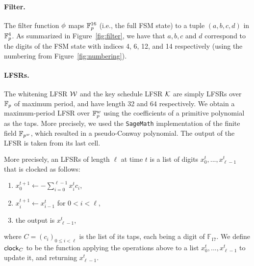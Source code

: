 

\paragraph{Filter.} The filter function $\phi$ maps $\mathbb{F}_{p}^{16}$ (i.e., the full FSM state) to a tuple $(a,b,c,d)$ in $\mathbb{F}_{p}^{4}$. As summarized in Figure~\ref{fig:filter}, we have that $a,b,c$ and $d$ correspond to the digits of the FSM state with indices 4, 6, 12, and 14 respectively (using the numbering from Figure~\ref{fig:numbering}).


\paragraph{LFSRs.} The whitening LFSR $\mathcal{W}$ and the key schedule LFSR $\mathcal{K}$ are simply LFSRs over \(\mathbb{F}_p\) of maximum period, and have length 32 and 64 respectively. We obtain a
  maximum-period LFSR over $\mathbb{F}_{p}^w$ using the coefficients of a
  primitive polynomial as the taps.  More precisely, we used the {\tt SageMath}
  implementation of the finite field $\mathbb{F}_{p^w}$, which resulted in a pseudo-Conway polynomial. The output of the LFSR is taken from its last cell.

  More precisely, an LFSRs of length $\ell$ at time $t$ is a list of digits ${x^t_0, ..., x^t_{\ell-1}}$
  that is clocked as follows:
  \begin{enumerate}
  \item $x_0^{t+1} \gets - \sum_{i=0}^{\ell-1} x_i^t c_i$,
  \item $x_{i}^{t+1} \gets x_{i-1}^t$ for $0 < i < \ell$,
  \item the output is $x_{\ell-1}^t$,
  \end{enumerate}
  where $C=(c_i)_{0 \leq i < \ell}$ is the list of its taps, each being
  a digit of $\mathbb{F}_{17}$. We define $\mathsf{clock}_{C}$ to be the function
  applying the operations above to a list ${x^t_0, ..., x^t_{\ell-1}}$
  to update it, and returning $x_{\ell-1}^t$.

